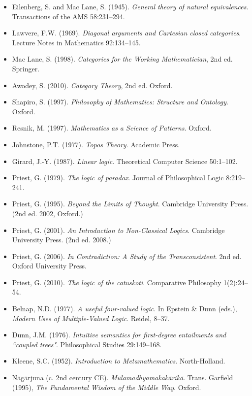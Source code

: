 \documentclass[12pt,a4paper]{article}
\begin{document}
\begin{itemize}
    \item Eilenberg, S. and Mac Lane, S. (1945). \emph{General theory of natural equivalences}. Transactions of the AMS 58:231--294.
    \item Lawvere, F.W. (1969). \emph{Diagonal arguments and Cartesian closed categories}. Lecture Notes in Mathematics 92:134--145.
    \item Mac Lane, S. (1998). \emph{Categories for the Working Mathematician}, 2nd ed. Springer.
    \item Awodey, S. (2010). \emph{Category Theory}, 2nd ed. Oxford.
    \item Shapiro, S. (1997). \emph{Philosophy of Mathematics: Structure and Ontology}. Oxford.
    \item Resnik, M. (1997). \emph{Mathematics as a Science of Patterns}. Oxford.
    \item Johnstone, P.T. (1977). \emph{Topos Theory}. Academic Press.
    \item Girard, J.-Y. (1987). \emph{Linear logic}. Theoretical Computer Science 50:1--102.
    \item Priest, G. (1979). \emph{The logic of paradox}. Journal of Philosophical Logic 8:219--241.
    \item Priest, G. (1995). \emph{Beyond the Limits of Thought}. Cambridge University Press. (2nd ed. 2002, Oxford.)
    \item Priest, G. (2001). \emph{An Introduction to Non-Classical Logics}. Cambridge University Press. (2nd ed. 2008.)
    \item Priest, G. (2006). \emph{In Contradiction: A Study of the Transconsistent}. 2nd ed. Oxford University Press.
    \item Priest, G. (2010). \emph{The logic of the catuskoti}. Comparative Philosophy 1(2):24--54.
    \item Belnap, N.D. (1977). \emph{A useful four-valued logic}. In Epstein \& Dunn (eds.), \emph{Modern Uses of Multiple-Valued Logic}. Reidel, 8--37.
    \item Dunn, J.M. (1976). \emph{Intuitive semantics for first-degree entailments and ``coupled trees"}. Philosophical Studies 29:149--168.
    \item Kleene, S.C. (1952). \emph{Introduction to Metamathematics}. North-Holland.
    \item N\={a}g\={a}rjuna (c. 2nd century CE). \emph{M\={u}lamadhyamakak\={a}rik\={a}}. Trans. Garfield (1995), \emph{The Fundamental Wisdom of the Middle Way}. Oxford.

\end{itemize}
\end{document}
